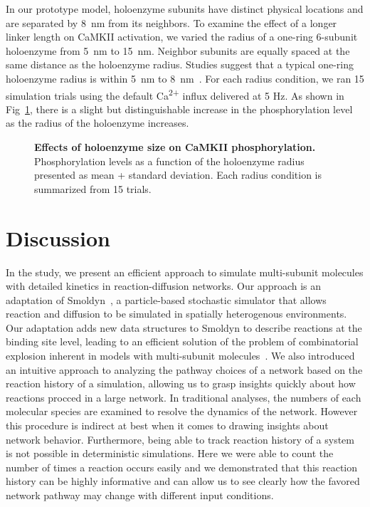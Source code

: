 \documentclass[10pt,letterpaper]{article}
\begin{document}
In our prototype model, holoenzyme subunits have distinct physical locations and are separated by \SI{8}{\nm} from its neighbors. To examine the effect of a longer linker length on CaMKII activation, we varied the radius of a one-ring 6-subunit holoenzyme from \SI{5}{\nm} to \SI{15}{\nm}. Neighbor subunits are equally spaced at the same distance as the holoenzyme radius. Studies suggest that a typical one-ring holoenzyme radius is within \SI{5}{\nm} to \SI{8}{\nm}~\cite{Chao:2011iw,Gaertner:2004jk}. For each radius condition, we ran 15 simulation trials using the default Ca\textsuperscript{2+} influx delivered at 5 Hz. As shown in Fig~\ref{fig12}, there is a slight but distinguishable increase in the phosphorylation level as the radius of the holoenzyme increases.

\begin{figure}[!h]
	\caption{{\bf Effects of holoenzyme size on CaMKII phosphorylation.}
	Phosphorylation levels as a function of the holoenzyme radius presented as mean + standard deviation. Each radius condition is summarized from 15 trials.
	}
\label{fig12}
\end{figure}


\section*{Discussion}
In the study, we present an efficient approach to simulate multi-subunit molecules with detailed kinetics in reaction-diffusion networks. Our approach is an adaptation of Smoldyn~\cite{Andrews:2004fs}, a particle-based stochastic simulator that allows reaction and diffusion to be simulated in spatially heterogenous environments. Our adaptation adds new data structures to Smoldyn to describe reactions at the binding site level, leading to an efficient solution of the problem of combinatorial explosion inherent in models with multi-subunit molecules~\cite{Stefan:2014gl}. We also introduced an intuitive approach to analyzing the pathway choices of a network based on the reaction history of a simulation, allowing us to grasp insights quickly about how reactions procced in a large network. In traditional analyses, the numbers of each molecular species are examined to resolve the dynamics of the network. However this procedure is indirect at best when it comes to drawing insights about network behavior. Furthermore, being able to track reaction history of a system is not possible in deterministic simulations. Here we were able to count the number of times a reaction occurs easily and we demonstrated that this reaction history can be highly informative and can allow us to see clearly how the favored network pathway may change with different input conditions.
\end{document}
